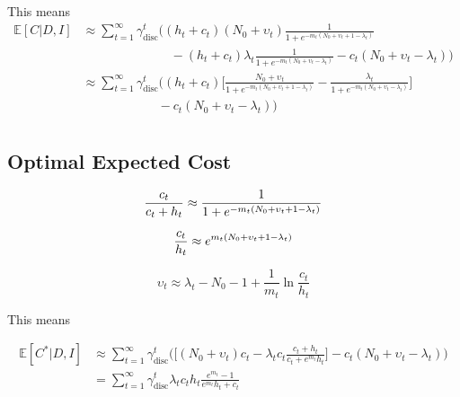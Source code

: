 This means
\begin{equation}
	\begin{split}
		\mathbb{E}[C|D,I] &\approx \sum_{t=1}^{\infty} \gamma_{\text{disc}}^{t} \bigg( 
		(h_t+c_t)(N_0 + \upsilon_t)\frac{1}{1+e^{-m_t(N_0+\upsilon_t+1-\lambda_t)}}\\
		&\qquad\qquad\qquad\quad-(h_t+c_t) \lambda_t\frac{1}{1+e^{-m_t(N_0+\upsilon_t-\lambda_t)}}
		- c_t(N_0 + \upsilon_t-\lambda_t)\bigg)\\
		&\approx \sum_{t=1}^{\infty} \gamma_{\text{disc}}^{t} \bigg( 
		(h_t+c_t)\bigg[\frac{N_0 + \upsilon_t}{1+e^{-m_t(N_0+\upsilon_t+1-\lambda_t)}}- \frac{\lambda_t}{1+e^{-m_t(N_0+\upsilon_t-\lambda_t)}}\bigg]\\
		&\qquad\qquad\qquad
		- c_t(N_0 + \upsilon_t-\lambda_t)\bigg)\\
	\end{split}
\end{equation}

\subsection{Optimal Expected Cost}

\begin{equation}
	\frac{c_t}{c_t+h_t}\approx\frac{1}{1+e^{-m_t(N_0+\upsilon_t+1-\lambda_t)}}\\
\end{equation}

\begin{equation}
	\frac{c_t}{h_t}\approx e^{m_t(N_0+\upsilon_t+1-\lambda_t)}\\
\end{equation}

\begin{equation}
	\upsilon_t\approx \lambda_t-N_0-1+\frac{1}{m_t}\ln\frac{c_t}{h_t} 
\end{equation}

This means

\begin{equation}
	\begin{split}
		\mathbb{E}[C^*|D,I] &\approx \sum_{t=1}^{\infty} \gamma_{\text{disc}}^{t} \bigg( 
		\bigg[(N_0 + \upsilon_t)c_t- \lambda_tc_t\frac{c_t+h_t}{c_t+e^{m_t}h_t}
		\bigg]- c_t(N_0 + \upsilon_t-\lambda_t)\bigg)\\
		&= \sum_{t=1}^{\infty} \gamma_{\text{disc}}^{t} \lambda_tc_th_t\frac{e^{m_t}-1}{e^{m_t}h_t+c_t}\\
	\end{split}
\end{equation}

